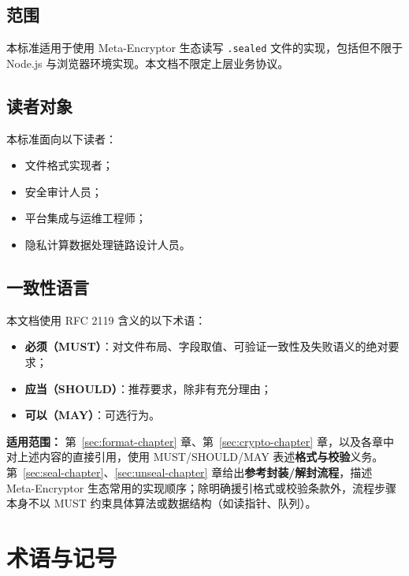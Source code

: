 \documentclass[11pt,a4paper]{article}
\begin{document}
\subsection{范围}
本标准适用于使用 Meta-Encryptor 生态读写 \texttt{.sealed} 文件的实现，包括但不限于 Node.js 与浏览器环境实现。本文档不限定上层业务协议。

\subsection{读者对象}
本标准面向以下读者：
\begin{itemize}
  \item 文件格式实现者；
  \item 安全审计人员；
  \item 平台集成与运维工程师；
  \item 隐私计算数据处理链路设计人员。
\end{itemize}

\subsection{一致性语言}
本文档使用 RFC 2119 含义的以下术语：
\begin{itemize}
  \item \textbf{必须（MUST）}：对文件布局、字段取值、可验证一致性及失败语义的绝对要求；
  \item \textbf{应当（SHOULD）}：推荐要求，除非有充分理由；
  \item \textbf{可以（MAY）}：可选行为。
\end{itemize}

\textbf{适用范围：} 第~\ref{sec:format-chapter} 章、第~\ref{sec:crypto-chapter} 章，以及各章中对上述内容的直接引用，使用 MUST/SHOULD/MAY 表述\textbf{格式与校验}义务。
第~\ref{sec:seal-chapter}、\ref{sec:unseal-chapter} 章给出\textbf{参考封装/解封流程}，描述 Meta-Encryptor 生态常用的实现顺序；除明确援引格式或校验条款外，流程步骤本身不以 MUST 约束具体算法或数据结构（如读指针、队列）。

\section{术语与记号}
\end{document}
